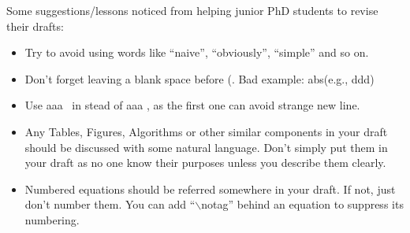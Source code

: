 Some suggestions/lessons noticed from helping junior PhD students to revise their drafts:
\begin{itemize}[leftmargin=*]
	\item Try to avoid using words like ``naive'', ``obviously'', ``simple'' and so on. 
	\item Don't forget leaving a blank space before (. Bad example: abs(e.g., ddd)
	\item Use aaa~\cite{cheng2016task} in stead of aaa \cite{cheng2016task}, as the first one can avoid strange
    \cite{cheng2016task} new line.
	\item Any Tables, Figures, Algorithms or other similar components in your draft should be discussed with some natural language. Don't simply put them in your draft as no one know their purposes unless you describe them clearly. 
	\item Numbered equations should be referred somewhere in your draft. If not, just don't number them. You can add ``$\backslash$notag'' behind an equation to suppress its numbering.
\end{itemize}